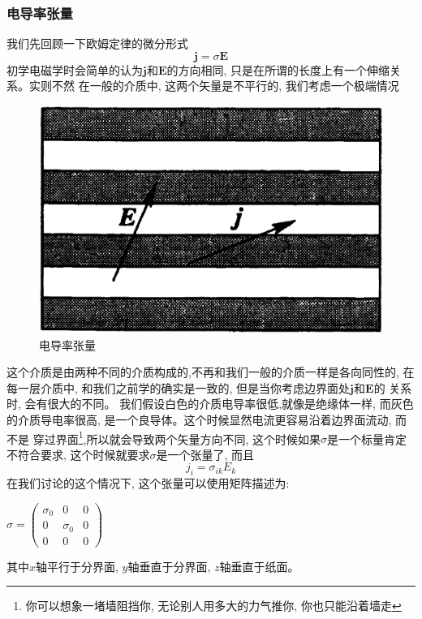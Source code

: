 \subsubsection*{电导率张量}
我们先回顾一下欧姆定律的微分形式$$\bm{j}=\sigma\bm{E}$$初学电磁学时会简单的认为$\bm{j}$和$\bm{E}$的方向相同, 只是在所谓的长度上有一个伸缩关系。实则不然
在一般的介质中, 这两个矢量是不平行的, 我们考虑一个极端情况
\begin{figure}[htbp]
    \centering
    \includegraphics[scale=0.3]{fig/a-4.eps}
    \caption{电导率张量}
\end{figure}
这个介质是由两种不同的介质构成的,不再和我们一般的介质一样是各向同性的, 在每一层介质中, 和我们之前学的确实是一致的, 但是当你考虑边界面处$\bm{j}$和$\bm{E}$的
关系时, 会有很大的不同。 我们假设白色的介质电导率很低,就像是绝缘体一样, 而灰色的介质导电率很高, 是一个良导体。这个时候显然电流更容易沿着边界面流动, 而不是
穿过界面\footnote[1]{你可以想象一堵墙阻挡你, 无论别人用多大的力气推你, 你也只能沿着墙走},所以就会导致两个矢量方向不同, 这个时候如果$\sigma$是一个标量肯定
不符合要求, 这个时候就要求$\sigma$是一个张量了, 而且$$j_i=\sigma_{ik}E_k$$在我们讨论的这个情况下, 这个张量可以使用矩阵描述为:
\begin{center}
    \begin{math}
        \displaystyle
        \sigma=
        \begin{pmatrix}
            \sigma_0&0&0\\
            0&\sigma_0&0\\
            0&0&0
        \end{pmatrix}
    \end{math}
\end{center}
其中$x$轴平行于分界面, $y$轴垂直于分界面, $z$轴垂直于纸面。

